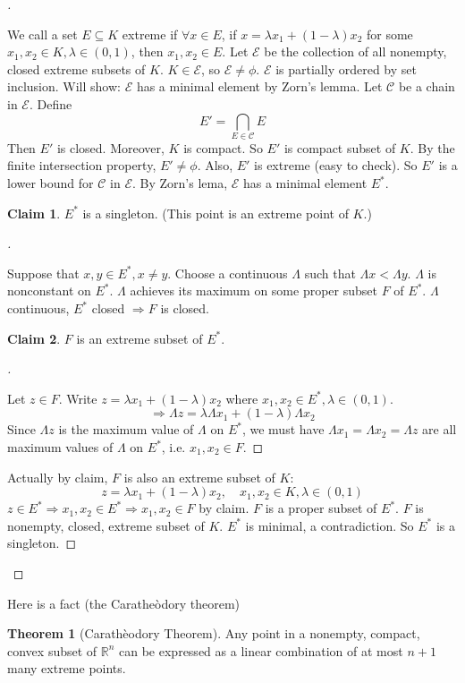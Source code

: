 \documentclass{article}
\theoremstyle{definition}
\newtheorem{thm}{Theorem}
\newtheorem*{clm}{Claim}
\newenvironment{proofs}[1][\proofname]{%
  \begin{proof}[#1]$ $\par\nobreak\ignorespaces
}{%
  \end{proof}
}
\newcommand{\C}{\mathcal C}
\newcommand{\E}{\mathcal E}
\newcommand{\RR}{\mathbb R}
\newcommand{\Ra}{\Rightarrow}
\begin{document}
\begin{proofs}
	We call a set $E \subseteq K$ extreme if $\forall x \in E$, if $x = \lambda x_1 + (1 - \lambda) x_2$ for some $x_1, x_2 \in K, \lambda \in (0, 1)$, then $x_1, x_2 \in E$.
	Let $\E$ be the collection of all nonempty, closed extreme subsets of $K$.
	$K \in \E$, so $\E \neq \phi$.
	$\E$ is partially ordered by set inclusion.
	Will show: $\E$ has a minimal element by Zorn's lemma.
	Let $\C$ be a chain in $\E$.
	Define
	\[
		E' = \bigcap_{E \in \C} E
	\]
	Then $E'$ is closed.
	Moreover, $K$ is compact.
	So $E'$ is compact subset of $K$.
	By the finite intersection property, $E' \neq \phi$.
	Also, $E'$ is extreme (easy to check).
	So $E'$ is a lower bound for $\C$ in $\E$.
	By Zorn's lema, $\E$ has a minimal element $E^*$.

	\begin{clm}
		$E^*$ is a singleton. 
		(This point is an extreme point of $K$.)
	\end{clm}
	
	\begin{proofs}
		Suppose that $x, y \in E^*, x \neq y$.
		Choose a continuous $\Lambda$ such that $\Lambda x < \Lambda y$.
		$\Lambda$ is nonconstant on $E^*$.
		$\Lambda$ achieves its maximum on some proper subset $F$ of $E^*$.
		$\Lambda$ continuous, $E^*$ closed $\Ra F$ is closed.
		\begin{clm}
			$F$ is an extreme subset of $E^*$.
		\end{clm}

		\begin{proofs}
			Let $z \in F$.
			Write $z = \lambda x_1 + (1 - \lambda) x_2$ where $x_1, x_2 \in E^*, \lambda \in (0, 1)$.
			\[
				\Ra \Lambda z = \lambda \Lambda x_1 + (1 - \lambda) \Lambda x_2
			\]
			Since $\Lambda z$ is the maximum value of $\Lambda$ on $E^*$, we must have $\Lambda x_1 = \Lambda x_2 = \Lambda z$ are all maximum values of $\Lambda$ on $E^*$, i.e. $x_1, x_2 \in F$.
		\end{proofs}
		Actually by claim, $F$ is also an extreme subset of $K$:
		\[
			z = \lambda x_1 + (1 - \lambda) x_2, \quad x_1, x_2 \in K, \lambda \in (0, 1)
		\]
		$z \in E^* \Ra x_1, x_2 \in E^* \Ra x_1, x_2 \in F$ by claim.
		$F$ is a proper subset of $E^*$.
		$F$ is nonempty, closed, extreme subset of $K$.
		$E^*$ is minimal, a contradiction.
		So $E^*$ is a singleton.
	\end{proofs}
\end{proofs}
Here is a fact (the Carathe\`odory theorem)

\begin{thm}[Carath\`eodory Theorem]
	Any point in a nonempty, compact, convex subset of $\RR^n$ can be expressed as a linear combination of at most $n + 1$ many extreme points.	
\end{thm}
\end{document}
